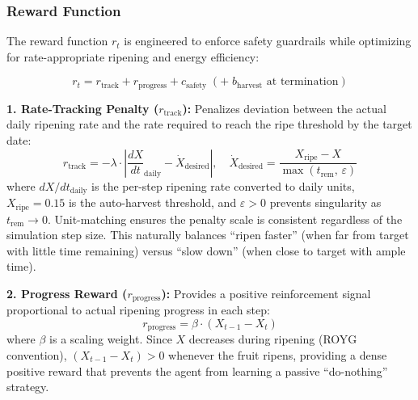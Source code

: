 \documentclass[conference]{IEEEtran}
\begin{document}
    \subsubsection{Reward Function}
    \label{sec:reward}

    The reward function $r_t$ is engineered to enforce safety guardrails while optimizing for rate-appropriate ripening and energy efficiency:

    \begin{equation}
    r_t = r_{\text{track}} + r_{\text{progress}} + c_{\text{safety}} \;(+ \; b_{\text{harvest}} \text{ at termination})
    \label{eq:reward}
    \end{equation}

    \noindent \textbf{1. Rate-Tracking Penalty ($r_{\text{track}}$):} Penalizes deviation between the actual daily ripening rate and the rate required to reach the ripe threshold by the target date:
    \begin{equation}
    r_{\text{track}} = -\lambda \cdot \left|\frac{dX}{dt}_{\text{daily}} - \dot{X}_{\text{desired}}\right|, \quad
    \dot{X}_{\text{desired}} = \frac{X_{\text{ripe}} - X}{\max(t_{\text{rem}},\, \varepsilon)}
    \label{eq:rtrack}
    \end{equation}
    \noindent where $dX/dt_{\text{daily}}$ is the per-step ripening rate converted to daily units, $X_{\text{ripe}} = 0.15$ is the auto-harvest threshold, and $\varepsilon > 0$ prevents singularity as $t_{\text{rem}} \to 0$.  Unit-matching ensures the penalty scale is consistent regardless of the simulation step size.  This naturally balances ``ripen faster'' (when far from target with little time remaining) versus ``slow down'' (when close to target with ample time).

    \noindent \textbf{2. Progress Reward ($r_{\text{progress}}$):} Provides a positive reinforcement signal proportional to actual ripening progress in each step:
    \begin{equation}
    r_{\text{progress}} = \beta \cdot (X_{t-1} - X_t)
    \end{equation}
    \noindent where $\beta$ is a scaling weight.  Since $X$ decreases during ripening (ROYG convention), $(X_{t-1} - X_t) > 0$ whenever the fruit ripens, providing a dense positive reward that prevents the agent from learning a passive ``do-nothing'' strategy.
\end{document}
